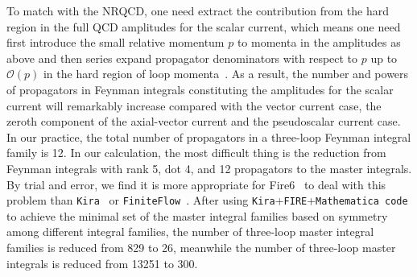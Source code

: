 \documentclass[onecolumn,preprintnumbers,aps,superscriptaddress,nofootinbib,prd,notitlepage]{revtex4-1}
\begin{document}
{To match with the NRQCD, one need extract the contribution from the hard region in the full QCD amplitudes for the scalar current, which means one need first introduce the small relative momentum $p$ to momenta in the amplitudes as above and then series expand propagator denominators with respect to $p$ up to $\mathcal{O}{(p)}$ in  the hard region of loop momenta~\cite{Kniehl:2006qw}.
As a result, the number and powers of propagators in Feynman integrals constituting the amplitudes for the scalar current will remarkably increase compared with  the vector current case,
the zeroth component of the axial-vector current and the pseudoscalar current case.
In our practice, the total number  of propagators in a three-loop Feynman integral family is 12.
In our calculation, the most difficult thing is the reduction from Feynman integrals    with rank 5, dot 4, and 12  propagators  to the master integrals.
By trial and  error, we find it is more  appropriate for  Fire6~\cite{Smirnov:2019qkx} to deal with this problem than {\texttt{Kira}}~\cite{Klappert:2020nbg} or {\texttt{FiniteFlow}}~\cite{Peraro:2019svx}.
After using  {\texttt{Kira}}+{\texttt{FIRE}}+{\texttt{Mathematica\,code}} to achieve the minimal set of the master integral families based on symmetry among different integral families,
the number of three-loop master integral families is reduced from 829  to 26, meanwhile the number of three-loop master integrals is reduced from 13251  to 300.

\begin{figure}[thb]
\end{figure}


\begin{figure}[thb]
\end{figure}



}
\end{document}
